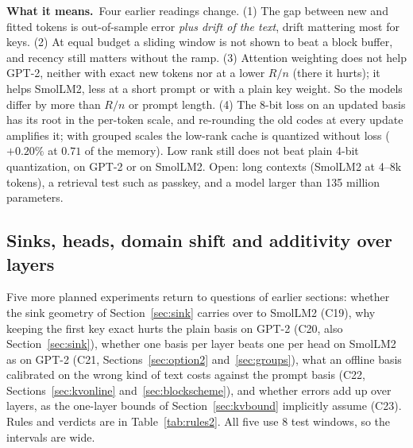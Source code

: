 \documentclass[10pt]{article}
\theoremstyle{plain}
\theoremstyle{definition}
\theoremstyle{remark}
\newcommand{\means}{\noindent\textbf{What it means.}\ }
\begin{document}
\means Four earlier readings change. (1) The gap between new and fitted tokens is out-of-sample error \emph{plus drift of the text}, drift mattering most for keys. (2) At equal budget a sliding window is not shown to beat a block buffer, and recency still matters without the ramp. (3) Attention weighting does not help GPT-2, neither with exact new tokens nor at a lower $R/n$ (there it hurts); it helps SmolLM2, less at a short prompt or with a plain key weight. So the models differ by more than $R/n$ or prompt length. (4) The 8-bit loss on an updated basis has its root in the per-token scale, and re-rounding the old codes at every update amplifies it; with grouped scales the low-rank cache is quantized without loss ($+0.20\%$ at $0.71$ of the memory). Low rank still does not beat plain 4-bit quantization, on GPT-2 or on SmolLM2. Open: long contexts (SmolLM2 at 4--8k tokens), a retrieval test such as passkey, and a model larger than 135 million parameters.


\subsection{Sinks, heads, domain shift and additivity over layers}
\label{sec:kvadditive}

Five more planned experiments return to questions of earlier sections: whether the sink geometry of Section~\ref{sec:sink} carries over to SmolLM2 (C19), why keeping the first key exact hurts the plain basis on GPT-2 (C20, also Section~\ref{sec:sink}), whether one basis per layer beats one per head on SmolLM2 as on GPT-2 (C21, Sections~\ref{sec:option2} and~\ref{sec:groups}), what an offline basis calibrated on the wrong kind of text costs against the prompt basis (C22, Sections~\ref{sec:kvonline} and~\ref{sec:blockscheme}), and whether errors add up over layers, as the one-layer bounds of Section~\ref{sec:kvbound} implicitly assume (C23). Rules and verdicts are in Table~\ref{tab:rules2}. All five use 8 test windows, so the intervals are wide.
\end{document}
